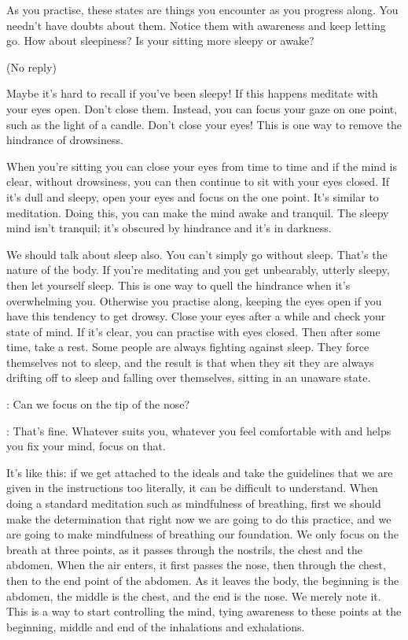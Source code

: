 As you practise, these states are things you encounter as you progress along. You needn't have doubts about them. Notice them with awareness and keep letting go. How about sleepiness? Is your sitting more sleepy or awake?

(No reply)

Maybe it's hard to recall if you've been sleepy! If this happens meditate with your eyes open. Don't close them. Instead, you can focus your gaze on one point, such as the light of a candle. Don't close your eyes! This is one way to remove the hindrance of drowsiness.

When you're sitting you can close your eyes from time to time and if the mind is clear, without drowsiness, you can then continue to sit with your eyes closed. If it's dull and sleepy, open your eyes and focus on the one point. It's similar to  meditation. Doing this, you can make the mind awake and tranquil. The sleepy mind isn't tranquil; it's obscured by hindrance and it's in darkness.

We should talk about sleep also. You can't simply go without sleep. That's the nature of the body. If you're meditating and you get unbearably, utterly sleepy, then let yourself sleep. This is one way to quell the hindrance when it's overwhelming you. Otherwise you practise along, keeping the eyes open if you have this tendency to get drowsy. Close your eyes after a while and check your state of mind. If it's clear, you can practise with eyes closed. Then after some time, take a rest. Some people are always fighting against sleep. They force themselves not to sleep, and the result is that when they sit they are always drifting off to sleep and falling over themselves, sitting in an unaware state.

: Can we focus on the tip of the nose?

: That's fine. Whatever suits you, whatever you feel comfortable with and helps you fix your mind, focus on that.

It's like this: if we get attached to the ideals and take the guidelines that we are given in the instructions too literally, it can be difficult to understand. When doing a standard meditation such as mindfulness of breathing, first we should make the determination that right now we are going to do this practice, and we are going to make mindfulness of breathing our foundation. We only focus on the breath at three points, as it passes through the nostrils, the chest and the abdomen. When the air enters, it first passes the nose, then through the chest, then to the end point of the abdomen. As it leaves the body, the beginning is the abdomen, the middle is the chest, and the end is the nose. We merely note it. This is a way to start controlling the mind, tying awareness to these points at the beginning, middle and end of the inhalations and exhalations.

